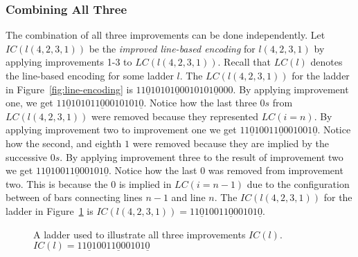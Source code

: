 \subsubsection{Combining All Three}
The combination of all three improvements can be done independently.\newline 
Let $IC(l(4,2,3,1))$ be the \emph{improved line-based encoding} for $l(4,2,3,1)$ 
by applying improvements 1-3 to $LC(l(4,2,3,1))$. Recall that $LC(l)$ denotes the line-based encoding for some ladder $l$.
The $LC(l(4,2,3,1))$ for the ladder in Figure~\ref{fig:line-encoding} is $11\underline{0}10101\underline{0}0010101\underline{0}000$.
By applying improvement one, we get $11\underline{0}101011\underline{0}0010101\underline{0}$. 
Notice how the last three $0s$ from $LC(l(4,2,3,1))$ were removed because they represented $LC(i=n)$.
By applying improvement two to improvement one we get $11\underline{0}10011\underline{0}001001\underline{0}$.
Notice how the second, and eighth $1$ were removed because they are implied by 
the successive $0s$. By applying improvement three to the result of improvement 
two we get $11\underline{0}10011\underline{0}00101\underline{0}$. Notice how the last $0$ 
was removed from improvement two. This is because the $0$ is implied in $LC(i=n-1)$
due to the configuration between of bars connecting lines $n-1$ and line $n$. The $IC(l(4,2,3,1))$ for the ladder in Figure~\ref{Fig:allthree} 
is $IC(l(4,2,3,1))=11\underline{0}10011\underline{0}00101\underline{0}$.\pagebreak

\begin{figure}[!htp]
     \centering
     \caption{A ladder used to illustrate all three improvements $IC(l)$. 
     \newline $IC(l)=11\underline{0}10011\underline{0}00101\underline{0}$}
     \label{Fig:allthree}
\end{figure}